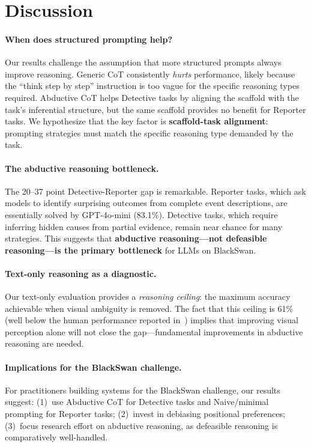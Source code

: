 \documentclass[10pt,twocolumn,letterpaper]{article}
\begin{document}
\section{Discussion}
\label{sec:discussion}

\paragraph{When does structured prompting help?}
Our results challenge the assumption that more structured prompts always improve reasoning. Generic CoT consistently \textit{hurts} performance, likely because the ``think step by step'' instruction is too vague for the specific reasoning types required. Abductive CoT helps Detective tasks by aligning the scaffold with the task's inferential structure, but the same scaffold provides no benefit for Reporter tasks. We hypothesize that the key factor is \textbf{scaffold-task alignment}: prompting strategies must match the specific reasoning type demanded by the task.

\paragraph{The abductive reasoning bottleneck.}
The 20--37 point Detective-Reporter gap is remarkable. Reporter tasks, which ask models to identify surprising outcomes from complete event descriptions, are essentially solved by GPT-4o-mini (83.1\%). Detective tasks, which require inferring hidden causes from partial evidence, remain near chance for many strategies. This suggests that \textbf{abductive reasoning---not defeasible reasoning---is the primary bottleneck} for LLMs on BlackSwan.

\paragraph{Text-only reasoning as a diagnostic.}
Our text-only evaluation provides a \textit{reasoning ceiling}: the maximum accuracy achievable when visual ambiguity is removed. The fact that this ceiling is 61\% (well below the human performance reported in~\cite{chinchure2025black}) implies that improving visual perception alone will not close the gap---fundamental improvements in abductive reasoning are needed.

\paragraph{Implications for the BlackSwan challenge.}
For practitioners building systems for the BlackSwan challenge, our results suggest: (1)~use Abductive CoT for Detective tasks and Naive/minimal prompting for Reporter tasks; (2)~invest in debiasing positional preferences; (3)~focus research effort on abductive reasoning, as defeasible reasoning is comparatively well-handled.
\end{document}
